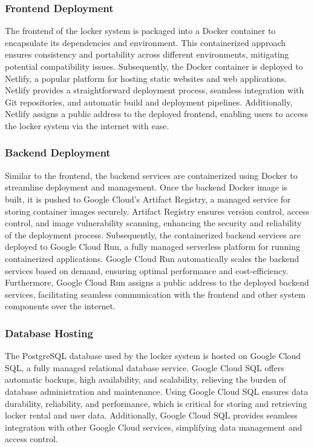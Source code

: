 \subsubsection{Frontend Deployment}
The frontend of the locker system is packaged into a Docker container to encapsulate its dependencies and environment. This containerized approach ensures consistency and portability across different environments, mitigating potential compatibility issues. Subsequently, the Docker container is deployed to Netlify, a popular platform for hosting static websites and web applications. Netlify provides a straightforward deployment process, seamless integration with Git repositories, and automatic build and deployment pipelines. Additionally, Netlify assigns a public address to the deployed frontend, enabling users to access the locker system via the internet with ease.

\subsubsection{Backend Deployment}
Similar to the frontend, the backend services are containerized using Docker to streamline deployment and management. Once the backend Docker image is built, it is pushed to Google Cloud's Artifact Registry, a managed service for storing container images securely. Artifact Registry ensures version control, access control, and image vulnerability scanning, enhancing the security and reliability of the deployment process. Subsequently, the containerized backend services are deployed to Google Cloud Run, a fully managed serverless platform for running containerized applications. Google Cloud Run automatically scales the backend services based on demand, ensuring optimal performance and cost-efficiency. Furthermore, Google Cloud Run assigns a public address to the deployed backend services, facilitating seamless communication with the frontend and other system components over the internet.

\subsubsection{Database Hosting}
The PostgreSQL database used by the locker system is hosted on Google Cloud SQL, a fully managed relational database service. Google Cloud SQL offers automatic backups, high availability, and scalability, relieving the burden of database administration and maintenance. Using Google Cloud SQL ensures data durability, reliability, and performance, which is critical for storing and retrieving locker rental and user data. Additionally, Google Cloud SQL provides seamless integration with other Google Cloud services, simplifying data management and access control.

